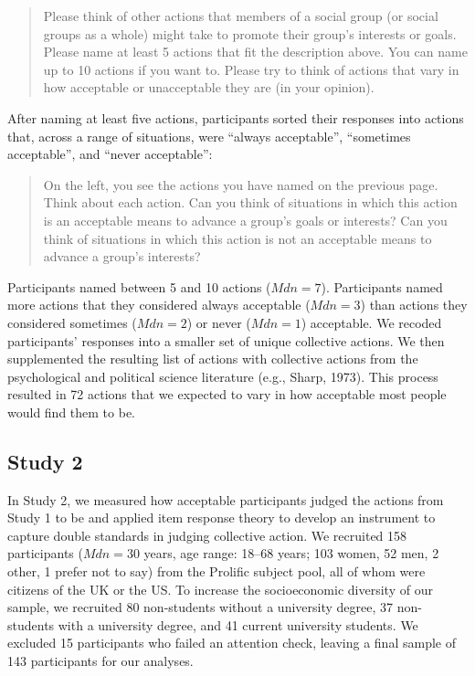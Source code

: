 \documentclass[12pt, letterpaper]{article}
\begin{document}
\begin{quote}
Please think of other actions that members of a social group (or social
groups as a whole) might take to promote their group's interests or
goals. Please name at least 5 actions that fit the description above.
You can name up to 10 actions if you want to. Please try to think of
actions that vary in how acceptable or unacceptable they are (in your
opinion).
\end{quote}

\noindent After naming at least five actions, participants sorted their
responses into actions that, across a range of situations, were ``always
acceptable'', ``sometimes acceptable'', and ``never acceptable'':

\begin{quote}
On the left, you see the actions you have named on the previous page.
Think about each action. Can you think of situations in which this
action is an acceptable means to advance a group's goals or interests?
Can you think of situations in which this action is not an acceptable
means to advance a group's interests?
\end{quote}

\noindent Participants named between 5 and 10 actions
(\(\textit{Mdn} = 7\)). Participants named more actions that they
considered always acceptable (\(\textit{Mdn} = 3\)) than actions they
considered sometimes (\(\textit{Mdn} = 2\)) or never
(\(\textit{Mdn} = 1\)) acceptable. We recoded participants' responses
into a smaller set of unique collective actions. We then supplemented
the resulting list of actions with collective actions from the
psychological and political science literature (e.g., Sharp, 1973). This
process resulted in 72 actions that we expected to vary in how
acceptable most people would find them to be.

\hypertarget{study-2}{%
\subsection{Study 2}\label{study-2}}

In Study 2, we measured how acceptable participants judged the actions
from Study 1 to be and applied item response theory to develop an
instrument to capture double standards in judging collective action. We
recruited 158 participants (\(\textit{Mdn} = 30\) years, age range:
18--68 years; 103 women, 52 men, 2 other, 1 prefer not to say) from the
Prolific subject pool, all of whom were citizens of the UK or the US. To
increase the socioeconomic diversity of our sample, we recruited 80
non-students without a university degree, 37 non-students with a
university degree, and 41 current university students. We excluded 15
participants who failed an attention check, leaving a final sample of
143 participants for our analyses.
\end{document}
